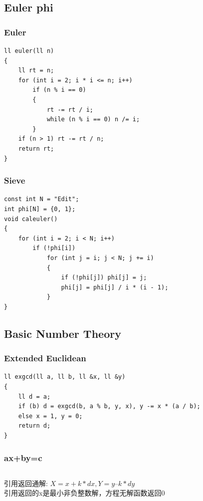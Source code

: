 \documentclass[twoside]{article}
\begin{document}
\subsection{Euler phi}

\subsubsection{Euler}

\begin{lstlisting}
ll euler(ll n)
{
    ll rt = n;
    for (int i = 2; i * i <= n; i++)
        if (n % i == 0)
        {
            rt -= rt / i;
            while (n % i == 0) n /= i;
        }
    if (n > 1) rt -= rt / n;
    return rt;
}
\end{lstlisting}

\subsubsection{Sieve}

\begin{lstlisting}
const int N = "Edit";
int phi[N] = {0, 1};
void caleuler()
{
    for (int i = 2; i < N; i++)
        if (!phi[i])
            for (int j = i; j < N; j += i)
            {
                if (!phi[j]) phi[j] = j;
                phi[j] = phi[j] / i * (i - 1);
            }
}
\end{lstlisting}

\subsection{Basic Number Theory}

\subsubsection{Extended Euclidean}

\begin{lstlisting}
ll exgcd(ll a, ll b, ll &x, ll &y)
{
    ll d = a;
    if (b) d = exgcd(b, a % b, y, x), y -= x * (a / b);
    else x = 1, y = 0;
    return d;
}
\end{lstlisting}

\subsubsection{ax+by=c}

\begin{lstlisting}
\end{lstlisting}
引用返回通解: $X = x + k * dx, Y = y – k * dy$\\
引用返回的x是最小非负整数解，方程无解函数返回0
\end{document}
